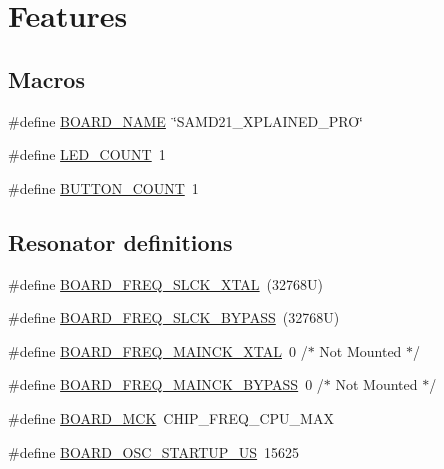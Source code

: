 \hypertarget{group__samd21__xplained__pro__features__group}{}\section{Features}
\label{group__samd21__xplained__pro__features__group}
\subsection*{Macros}
\begin{DoxyCompactItemize}
\item 
\#define \mbox{\hyperlink{group__samd21__xplained__pro__features__group_ga02581754b212d533d96cde56c8145c9b}{B\+O\+A\+R\+D\+\_\+\+N\+A\+ME}}~\char`\"{}S\+A\+M\+D21\+\_\+\+X\+P\+L\+A\+I\+N\+E\+D\+\_\+\+P\+RO\char`\"{}
\item 
\#define \mbox{\hyperlink{group__samd21__xplained__pro__features__group_gad698e2cb680601529f08c3e5f2b0cebb}{L\+E\+D\+\_\+\+C\+O\+U\+NT}}~1
\item 
\#define \mbox{\hyperlink{group__samd21__xplained__pro__features__group_ga687f94d4d3be4db86a833082ecdf980a}{B\+U\+T\+T\+O\+N\+\_\+\+C\+O\+U\+NT}}~1
\end{DoxyCompactItemize}
\subsection*{Resonator definitions}
\begin{DoxyCompactItemize}
\item 
\#define \mbox{\hyperlink{group__samd21__xplained__pro__features__group_ga29729f712d94e421615d41fbf2748311}{B\+O\+A\+R\+D\+\_\+\+F\+R\+E\+Q\+\_\+\+S\+L\+C\+K\+\_\+\+X\+T\+AL}}~(32768\+U)
\item 
\#define \mbox{\hyperlink{group__samd21__xplained__pro__features__group_gadf99a31614b830d438308afe88d4bc35}{B\+O\+A\+R\+D\+\_\+\+F\+R\+E\+Q\+\_\+\+S\+L\+C\+K\+\_\+\+B\+Y\+P\+A\+SS}}~(32768\+U)
\item 
\#define \mbox{\hyperlink{group__samd21__xplained__pro__features__group_gaf114fed8746a25b7afa90614bd2150bb}{B\+O\+A\+R\+D\+\_\+\+F\+R\+E\+Q\+\_\+\+M\+A\+I\+N\+C\+K\+\_\+\+X\+T\+AL}}~0 /$\ast$ Not Mounted $\ast$/
\item 
\#define \mbox{\hyperlink{group__samd21__xplained__pro__features__group_ga4242232aa80f183e350266e7b422b12d}{B\+O\+A\+R\+D\+\_\+\+F\+R\+E\+Q\+\_\+\+M\+A\+I\+N\+C\+K\+\_\+\+B\+Y\+P\+A\+SS}}~0 /$\ast$ Not Mounted $\ast$/
\item 
\#define \mbox{\hyperlink{group__samd21__xplained__pro__features__group_gae9cca1603768bb2e6c82bd0ccedf2b5c}{B\+O\+A\+R\+D\+\_\+\+M\+CK}}~C\+H\+I\+P\+\_\+\+F\+R\+E\+Q\+\_\+\+C\+P\+U\+\_\+\+M\+AX
\item 
\#define \mbox{\hyperlink{group__samd21__xplained__pro__features__group_ga72c1c5d05c0eee527f680ead3d7c3f09}{B\+O\+A\+R\+D\+\_\+\+O\+S\+C\+\_\+\+S\+T\+A\+R\+T\+U\+P\+\_\+\+US}}~15625
\end{DoxyCompactItemize}

